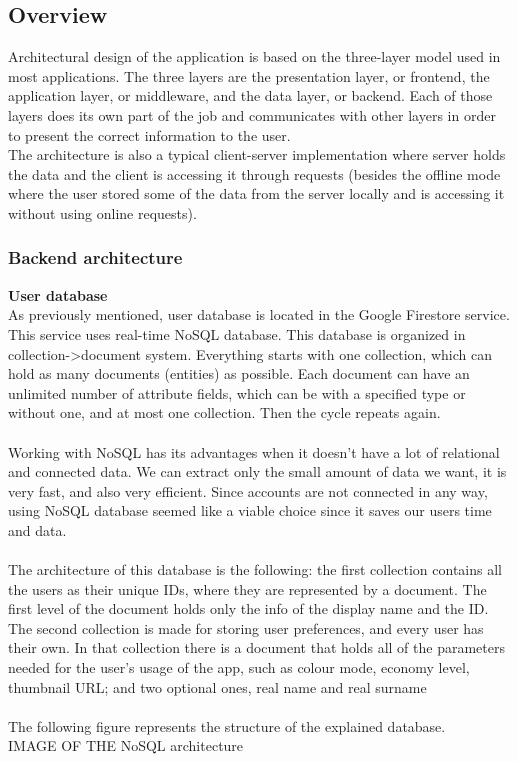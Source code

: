 \subsection{Overview}
\hspace{\parindent}Architectural design of the application is based on the three-layer model used in most applications. The three layers are the presentation layer, or frontend, the application layer, or middleware, and the data layer, or backend. Each of those layers does its own part of the job and communicates with other layers in order to present the correct information to the user.\\
The architecture is also a typical client-server implementation where server holds the data and the client is accessing it through requests (besides the offline mode where the user stored some of the data from the server locally and is accessing it without using online requests).\\
\subsubsection{Backend architecture}
\textbf{User database}\\

As previously mentioned, user database is located in the Google Firestore service. This service uses real-time NoSQL database. This database is organized in collection->document system. Everything starts with one collection, which can hold as many documents (entities) as possible. Each document can have an unlimited number of attribute fields, which can be with a specified type or without one, and at most one collection. Then the cycle repeats again.\\ \\
Working with NoSQL has its advantages when it doesn't have a lot of relational and connected data. We can extract only the small amount of data we want, it is very fast, and also very efficient. Since accounts are not connected in any way, using NoSQL database  seemed like a viable choice since it saves our users time and data. \\ \\
The architecture of this database is the following: the first collection contains all the users as their unique IDs, where they are represented by a document. The first level of the document holds only the info of the display name and the ID.  The second collection is made for storing user preferences, and every user has their own. In that collection there is a document that holds all of the parameters needed for the user's usage of the app, such as colour mode, economy level, thumbnail URL; and two optional ones, real name and real surname
\\ \\
The following figure represents the structure of the explained database.\\
IMAGE OF THE NoSQL architecture


